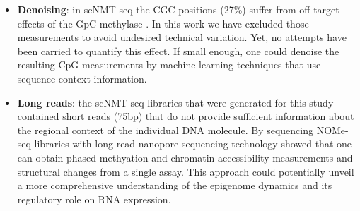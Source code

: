 \begin{itemize}
	\item \textbf{Denoising}: in scNMT-seq the CGC positions (27\%) suffer from off-target effects of the GpC methylase \cite{Kelly2012}. In this work we have excluded those measurements to avoid undesired technical variation. Yet, no attempts have been carried to quantify this effect. If small enough, one could denoise the resulting CpG measurements by machine learning techniques that use sequence context information.


	\item \textbf{Long reads}: the scNMT-seq libraries that were generated for this study contained short reads (75bp) that do not provide sufficient information about the regional context of the individual DNA molecule. By sequencing NOMe-seq libraries with long-read nanopore sequencing technology \cite{Lee2018} showed that one can obtain phased methyation and chromatin accessibility measurements and structural changes from a single assay. This approach could potentially unveil a more comprehensive understanding of the epigenome dynamics and its regulatory role on RNA expression.

\end{itemize}



